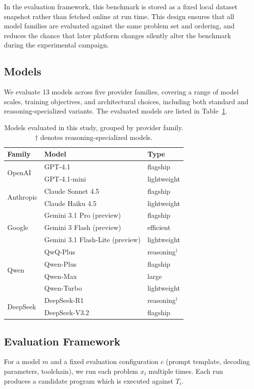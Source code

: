 \documentclass[11pt]{article}
\begin{document}
In the evaluation framework, this benchmark is stored as a fixed local dataset snapshot rather than fetched online at run time. This design ensures that all model families are evaluated against the same problem set and ordering, and reduces the chance that later platform changes silently alter the benchmark during the experimental campaign.

\subsection{Models}

We evaluate 13 models across five provider families, covering a range of model scales, training objectives, and architectural choices, including both standard and reasoning-specialized variants. The evaluated models are listed in Table~\ref{tab:models}.

\begin{table}[t]
\centering
\small
\caption{Models evaluated in this study, grouped by provider family. $\dagger$ denotes reasoning-specialized models.}
\label{tab:models}
\begin{tabular}{lll}
\toprule
Family & Model & Type \\
\midrule
\multirow{2}{*}{OpenAI}
  & GPT-4.1         & flagship \\
  & GPT-4.1-mini    & lightweight \\
\midrule
\multirow{2}{*}{Anthropic}
  & Claude Sonnet 4.5 & flagship \\
  & Claude Haiku 4.5  & lightweight \\
\midrule
\multirow{3}{*}{Google}
  & Gemini 3.1 Pro (preview)        & flagship \\
  & Gemini 3 Flash (preview)        & efficient \\
  & Gemini 3.1 Flash-Lite (preview) & lightweight \\
\midrule
\multirow{4}{*}{Qwen}
  & QwQ-Plus   & reasoning$^\dagger$ \\
  & Qwen-Plus  & flagship \\
  & Qwen-Max   & large \\
  & Qwen-Turbo & lightweight \\
\midrule
\multirow{2}{*}{DeepSeek}
  & DeepSeek-R1   & reasoning$^\dagger$ \\
  & DeepSeek-V3.2 & flagship \\
\bottomrule
\end{tabular}
\end{table}

\subsection{Evaluation Framework}
For a model $m$ and a fixed evaluation configuration $c$ (prompt template, decoding parameters, toolchain), we run each problem $x_i$ multiple times. Each run produces a candidate program which is executed against $T_i$.
\end{document}
